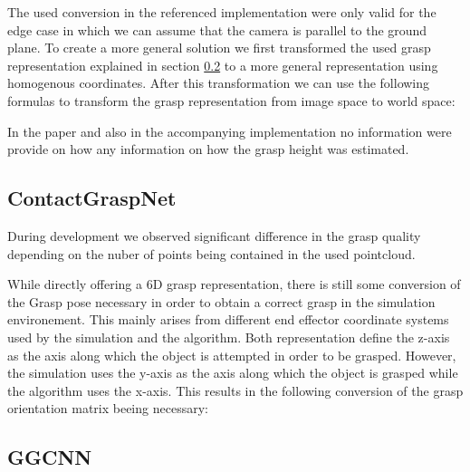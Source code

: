 The used conversion in the referenced implementation were only valid for the edge case in which we can assume that the camera is parallel to the ground plane.
To create a more general solution we first transformed the used grasp representation explained in section \ref{} to a more general representation using homogenous coordinates.
After this transformation we can use the following formulas to transform the grasp representation from image space to world space:

In the \cite{kumra2020antipodal} paper and also in the accompanying implementation no information were provide on how any information on how the grasp height was estimated.


\subsection{ContactGraspNet}
During development we observed significant difference in the grasp quality depending on the nuber of points being contained in the used pointcloud.

While directly offering a 6D grasp representation, there is still some conversion of the Grasp pose necessary in order to obtain a correct grasp in the simulation environement.
This mainly arises from different end effector coordinate systems used by the simulation and the algorithm.
Both representation define the z-axis as the axis along which the object is attempted in order to be grasped.
However, the simulation uses the y-axis as the axis along which the object is grasped while the algorithm uses the x-axis.
This results in the following conversion of the grasp orientation matrix beeing necessary:

\subsection{GGCNN}
